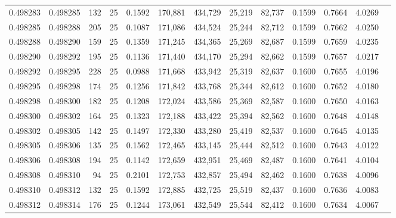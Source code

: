 \begin{tabular}{rrrrrrrrrrrrr}
0.498283 & 0.498285 & 132 &  25 &                                     0.1592 & 170,881 & 434,729 &  25,219 &  82,737 & 0.1599 & 0.7664 & 4.0269 \\
0.498285 & 0.498288 & 205 &  25 &                                     0.1087 & 171,086 & 434,524 &  25,244 &  82,712 & 0.1599 & 0.7662 & 4.0250 \\
0.498288 & 0.498290 & 159 &  25 &                                     0.1359 & 171,245 & 434,365 &  25,269 &  82,687 & 0.1599 & 0.7659 & 4.0235 \\
0.498290 & 0.498292 & 195 &  25 &                                     0.1136 & 171,440 & 434,170 &  25,294 &  82,662 & 0.1599 & 0.7657 & 4.0217 \\
0.498292 & 0.498295 & 228 &  25 &                                     0.0988 & 171,668 & 433,942 &  25,319 &  82,637 & 0.1600 & 0.7655 & 4.0196 \\
0.498295 & 0.498298 & 174 &  25 &                                     0.1256 & 171,842 & 433,768 &  25,344 &  82,612 & 0.1600 & 0.7652 & 4.0180 \\
0.498298 & 0.498300 & 182 &  25 &                                     0.1208 & 172,024 & 433,586 &  25,369 &  82,587 & 0.1600 & 0.7650 & 4.0163 \\
0.498300 & 0.498302 & 164 &  25 &                                     0.1323 & 172,188 & 433,422 &  25,394 &  82,562 & 0.1600 & 0.7648 & 4.0148 \\
0.498302 & 0.498305 & 142 &  25 &                                     0.1497 & 172,330 & 433,280 &  25,419 &  82,537 & 0.1600 & 0.7645 & 4.0135 \\
0.498305 & 0.498306 & 135 &  25 &                                     0.1562 & 172,465 & 433,145 &  25,444 &  82,512 & 0.1600 & 0.7643 & 4.0122 \\
0.498306 & 0.498308 & 194 &  25 &                                     0.1142 & 172,659 & 432,951 &  25,469 &  82,487 & 0.1600 & 0.7641 & 4.0104 \\
0.498308 & 0.498310 &  94 &  25 &                                     0.2101 & 172,753 & 432,857 &  25,494 &  82,462 & 0.1600 & 0.7638 & 4.0096 \\
0.498310 & 0.498312 & 132 &  25 &                                     0.1592 & 172,885 & 432,725 &  25,519 &  82,437 & 0.1600 & 0.7636 & 4.0083 \\
0.498312 & 0.498314 & 176 &  25 &                                     0.1244 & 173,061 & 432,549 &  25,544 &  82,412 & 0.1600 & 0.7634 & 4.0067 \\

\end{tabular}
